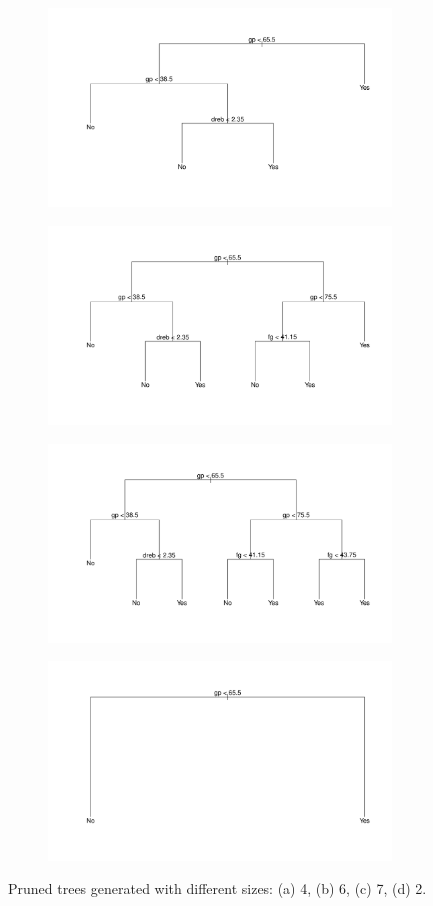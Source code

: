 \begin{figure}[H]
	\centering
	\begin{subfigure}{.5\textwidth}
		\centering
		\includegraphics[width=0.6\linewidth]{ImageFiles/Classification/Trees/tree_size_4.pdf}
		\caption{}
		\label{fig:tree_size_4}
	\end{subfigure}%
	\begin{subfigure}{.5\textwidth}
		\centering
		\includegraphics[width=0.6\linewidth]{ImageFiles/Classification/Trees/tree_size_6.pdf}
		\caption{}
		\label{fig:tree_size_6}
	\end{subfigure}
	\begin{subfigure}{.5\textwidth}
		\centering
		\includegraphics[width=0.6\linewidth]{ImageFiles/Classification/Trees/tree_size_7.pdf}
		\caption{}
		\label{fig:tree_size_7}
	\end{subfigure}%
	\begin{subfigure}{.5\textwidth}
		\centering
		\includegraphics[width=0.6\linewidth]{ImageFiles/Classification/Trees/tree_size_2.pdf}
		\caption{}
		\label{fig:tree_size_2}
	\end{subfigure}
	\caption{Pruned trees generated with different sizes: (a) 4, (b) 6, (c) 7, (d) 2.}
	\label{fig:trees_size}
\end{figure}

